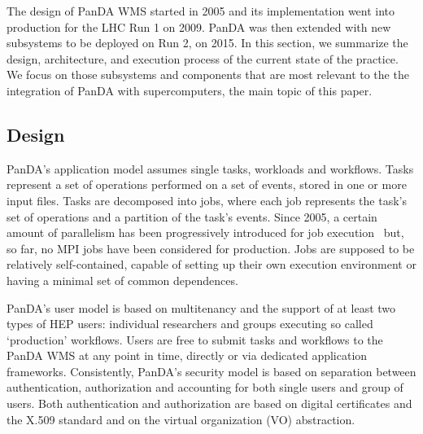 The design of PanDA WMS started in 2005 and its implementation went into
production for the LHC Run 1 on 2009. PanDA was then extended with new
subsystems to be deployed on Run 2, on 2015. In this section, we summarize the
design, architecture, and execution process of the current state of the
practice. We focus on those subsystems and components that are most relevant to
the the integration of PanDA with supercomputers, the main topic of this paper.


\subsection{Design}
\label{ssec:panda_design}


PanDA's application model assumes single tasks, workloads and workflows. Tasks
represent a set of operations performed on a set of events, stored in one or
more input files. Tasks are decomposed into jobs, where each job represents the
task's set of operations and a partition of the task's events. Since 2005, a
certain amount of parallelism has been progressively introduced for job
execution~\cite{crooks2012multi} but, so far, no MPI jobs have been considered
for production. Jobs are supposed to be relatively self-contained, capable of
setting up their own execution environment or having a minimal set of common
dependences.


PanDA's user model is based on multitenancy and the support of at least two
types of HEP users: individual researchers and groups executing so called
`production' workflows. Users are free to submit tasks and workflows to the
PanDA WMS at any point in time, directly or via dedicated application
frameworks. Consistently, PanDA's security model is based on separation between
authentication, authorization and accounting for both single users and group of
users. Both authentication and authorization are based on digital certificates
and the X.509 standard and on the virtual organization (VO) abstraction.

